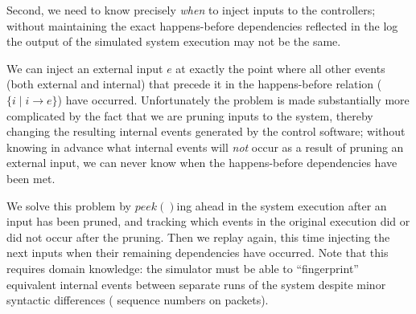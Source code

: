 {Second, we need to know precisely {\em when} to inject inputs to the controllers;
without maintaining the exact happens-before dependencies reflected in the
log the output of the simulated system execution may not be the same.

We can inject an external input $e$ at exactly the point where all other
events (both external and internal) that precede it in the happens-before
relation ($\{i \mid i \rightarrow e\}$) have occurred. Unfortunately the problem is made
substantially more complicated by the fact that we are pruning inputs to the
system, thereby changing the resulting internal events generated by the control
software; without knowing in advance what internal events will {\em not} occur
as a result of pruning an external input, we can never know when the happens-before
dependencies have been met.

We solve this problem by $peek()$ing ahead in the system execution after an
input has been pruned, and tracking which events in the original execution did
or did not occur after the pruning. Then we replay again, this time injecting
the next inputs when their remaining dependencies have occurred. Note that
this requires domain knowledge: the simulator must be able to ``fingerprint''
equivalent internal events between separate runs of
the system despite minor
syntactic differences (\eg{} sequence numbers on packets).


\eat{

%
%
%
%
%
%



}}

